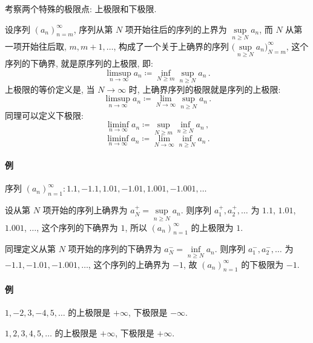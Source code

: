 \documentclass[UTF8]{ctexart}
\theoremstyle{mystyle}
\theoremstyle{myremark}
\theoremstyle{plain}
\begin{document}
考察两个特殊的极限点: 上极限和下极限.
\begin{definition}
    设序列 $ (a_n)_{n = m}^\infty $, 序列从第 $ N $ 项开始往后的序列的上界为 $ \sup\limits_{n \geqslant N} a_n $, 而 $ N $ 从第一项开始往后取, $ m, m + 1, \dots $, 构成了一个关于上确界的序列 $ \Big( \sup\limits_{n \geqslant N} a_n \Big)_{N = m}^\infty $, 这个序列的下确界, 就是原序列的上极限, 即: \[ \limsup_{n \to \infty} a_n \coloneqq \inf_{N \geqslant m} \sup_{n \geqslant N} a_n  \,.\] 上极限的等价定义是, 当 $ N \to \infty $ 时, 上确界序列的极限就是序列的上极限: \[ \limsup_{n \to \infty} a_n \coloneqq \lim_{N \to \infty} \sup_{n \geqslant N} a_n \,.\] 同理可以定义下极限: \[ \liminf_{n \to \infty} a_n \coloneqq \sup_{N \geqslant m} \inf_{n \geqslant N} a_n \,,\] \[ \liminf_{n \to \infty} a_n \coloneqq \lim_{N \to \infty} \inf_{n \geqslant N} a_n \,.\] 
\end{definition}


\paragraph{例}
序列 $ (a_n)_{n = 1}^\infty \colon 1.1, -1.1, 1.01, -1.01, 1.001, -1.001, \dots $

设从第 $ N $ 项开始的序列上确界为 $ a_N^+ = \sup\limits_{n \geqslant N} a_n $. 则序列 $ a_1^+, a_2^+, \dots $ 为 $ 1.1 $, $1.01$, $1.001$, $\dots $, 这个序列的下确界为 $ 1 $, 所以 $ (a_n)_{n = 1}^\infty $ 的上极限为 $ 1 $.

同理定义从第 $ N $ 项开始的序列的下确界为 $ a_N^- = \inf\limits_{n \geqslant N} a_n $. 则序列 $ a_1^-, a_2^-, \dots $ 为 $ -1.1, -1.01, -1.001, \dots $, 这个序列的上确界为 $ -1 $, 故 $ (a_n)_{n = 1}^\infty $ 的下极限为 $ -1 $.

\paragraph{例}
$ 1, -2, 3, -4, 5, \dots $ 的上极限是 $ +\infty $, 下极限是 $ -\infty $.

$ 1, 2, 3, 4, 5, \dots $ 的上极限是 $ +\infty $, 下极限是 $ +\infty $.

\end{document}
